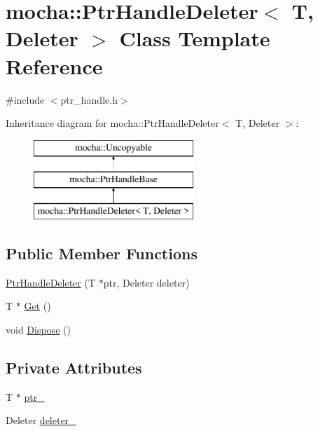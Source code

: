 \hypertarget{classmocha_1_1_ptr_handle_deleter}{
\section{mocha::PtrHandleDeleter$<$ T, Deleter $>$ Class Template Reference}
\label{classmocha_1_1_ptr_handle_deleter}
}


{\ttfamily \#include $<$ptr\_\-handle.h$>$}

Inheritance diagram for mocha::PtrHandleDeleter$<$ T, Deleter $>$:\begin{figure}[H]
\begin{center}
\leavevmode
\includegraphics[height=3.000000cm]{classmocha_1_1_ptr_handle_deleter}
\end{center}
\end{figure}
\subsection*{Public Member Functions}
\begin{DoxyCompactItemize}
\item 
\hyperlink{classmocha_1_1_ptr_handle_deleter_a0f46c798fb9c0986826e9cc37dddd457}{PtrHandleDeleter} (T $\ast$ptr, Deleter deleter)
\item 
T $\ast$ \hyperlink{classmocha_1_1_ptr_handle_deleter_aac04ac23d5a0b7a69de4f8c495372b0c}{Get} ()
\item 
void \hyperlink{classmocha_1_1_ptr_handle_deleter_aaf03758186b35a8ce0ff7eb294f89d15}{Dispose} ()
\end{DoxyCompactItemize}
\subsection*{Private Attributes}
\begin{DoxyCompactItemize}
\item 
T $\ast$ \hyperlink{classmocha_1_1_ptr_handle_deleter_adc61cf9a3c8ce76822c978668ae8317d}{ptr\_\-}
\item 
Deleter \hyperlink{classmocha_1_1_ptr_handle_deleter_af8376cc3e894e2c7546ccb7c8af7fca6}{deleter\_\-}
\end{DoxyCompactItemize}


